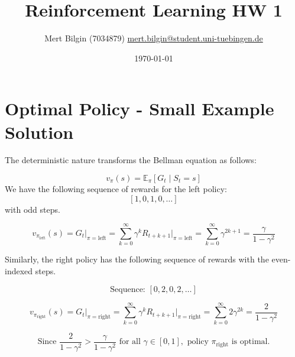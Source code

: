 \documentclass{article}
\title{Reinforcement Learning HW 1}
\author{Mert Bilgin (7034879) \url{mert.bilgin@student.uni-tuebingen.de}}
\date{\today}
\begin{document}
\maketitle


\section{Optimal Policy - Small Example Solution}


The deterministic nature transforms the Bellman equation as follows:

\[
v_\pi(s) = \mathbb{E}_\pi \left[ G_t \mid S_t = s \right]
\]
We have the following sequence of rewards for the left policy:
\[
[1, 0, 1, 0, \dots] 
\]
with odd steps.

\[
v_{\pi_{\text{left}}}(s) = G_t \Big|_{\pi = \text{left}} 
= \sum_{k=0}^{\infty} \gamma^k R_{t+k+1} \Big|_{\pi = \text{left}} 
= \sum_{k=0}^{\infty} \gamma^{2k+1} 
= \frac{\gamma}{1 - \gamma^2}
\]

Similarly, the right policy has the following sequence of rewards with the even-indexed steps.

\[
\text{Sequence: } [0, 2, 0, 2, \dots]
\]

\[
v_{\pi_{\text{right}}}(s) = G_t \Big|_{\pi = \text{right}} 
= \sum_{k=0}^{\infty} \gamma^k R_{t+k+1} \Big|_{\pi = \text{right}} 
= \sum_{k=0}^{\infty} 2 \gamma^{2k} 
= \frac{2}{1 - \gamma^2}
\]



\[
\text{Since } \frac{2}{1 - \gamma^2} > \frac{\gamma}{1 - \gamma^2}
\text{ for all } \gamma \in [0, 1], 
\text{ policy } \pi_{\text{right}} \text{ is optimal.}
\]
\end{document}
